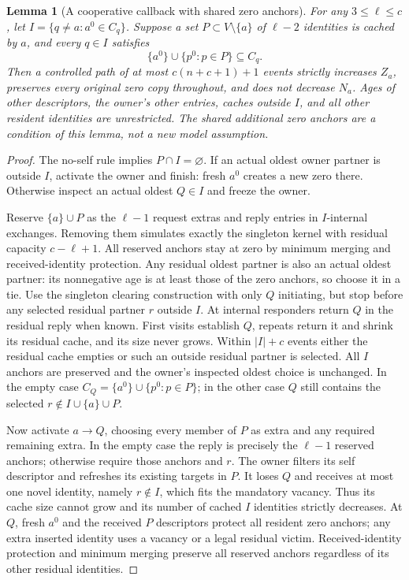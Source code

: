 \documentclass[11pt]{article}
\newtheorem{lemma}[theorem]{Lemma}
\begin{document}
\begin{lemma}[A cooperative callback with shared zero anchors]
\label{lem:threecooperativecallback}
For any $3\le\ell\le c$, let
$I=\{q\ne a:a^0\in C_q\}$.
Suppose a set $P\subset V\setminus\{a\}$ of
$\ell-2$ identities is cached by $a$, and every
$q\in I$ satisfies
\[
 \{a^0\}\cup\{p^0:p\in P\}\subseteq C_q.
\]
Then a controlled path of at most $c(n+c+1)+1$
events strictly increases $Z_a$, preserves every
original zero copy throughout, and does not decrease
$N_a$. Ages of other descriptors, the owner's other
entries, caches outside $I$, and all other resident
identities are unrestricted. The shared additional zero
anchors are a condition of this lemma, not a new model
assumption.
\end{lemma}
\begin{proof}
The no-self rule implies $P\cap I=\varnothing$.
If an actual oldest owner partner is outside $I$,
activate the owner and finish: fresh $a^0$ creates a
new zero there. Otherwise inspect an actual oldest
$Q\in I$ and freeze the owner.

Reserve $\{a\}\cup P$ as the $\ell-1$ request extras and reply
entries in $I$-internal exchanges. Removing them
simulates exactly the singleton kernel with residual
capacity $c-\ell+1$. All reserved anchors stay at zero
by minimum merging and received-identity protection.
Any residual oldest partner is also an actual oldest
partner: its nonnegative age is at least those of
the zero anchors, so choose it in a tie.
Use the singleton clearing construction with only
$Q$ initiating, but stop before any selected residual
partner $r$ outside $I$. At internal responders return
$Q$ in the residual reply when known. First visits
establish $Q$, repeats return it and shrink its
residual cache, and its size never grows. Within
$|I|+c$ events either the residual cache empties or
such an outside residual partner is selected.
All $I$ anchors are preserved and the owner's
inspected oldest choice is unchanged. In the empty
case $C_Q=\{a^0\}\cup\{p^0:p\in P\}$;
in the other case $Q$
still contains the selected $r\notin I\cup\{a\}\cup P$.

Now activate $a\to Q$, choosing every member of $P$
as extra and any required remaining extra. In the empty
case the reply is precisely the $\ell-1$ reserved
anchors; otherwise require those anchors and $r$.
The owner filters its self descriptor and refreshes
its existing targets in $P$.
It loses $Q$ and receives at most one novel identity,
namely $r\notin I$, which fits the mandatory vacancy.
Thus its cache size cannot grow and its number of
cached $I$ identities strictly decreases. At $Q$,
fresh $a^0$ and the received $P$ descriptors protect
all resident zero anchors;
any extra inserted identity uses a vacancy or a legal
residual victim. Received-identity protection and
minimum merging preserve all reserved anchors regardless
of its other residual identities.


\end{proof}
\end{document}
